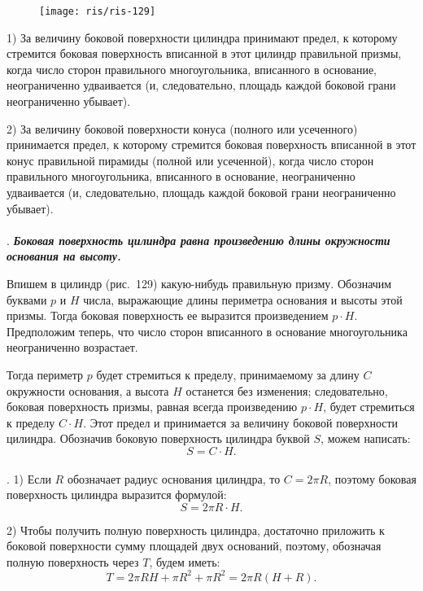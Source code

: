 \documentclass[twoside]{book}
\begin{document}
\begin{figure}[h!]
\centering
\texttt{[image: ris/ris-129]}
\caption{}
\end{figure}

1) За величину боковой поверхности цилиндра принимают предел, к которому стремится боковая поверхность вписанной в этот цилиндр правильной призмы, когда число сторон правильного многоугольника, вписанного в основание, неограниченно удваивается (и, следовательно, площадь каждой боковой грани неограниченно убывает).

2) За величину боковой поверхности конуса (полного или усеченного) принимается предел, к которому стремится боковая поверхность вписанной в этот конус правильной пирамиды (полной или усеченной), когда число сторон правильного многоугольника, вписанного в основание, неограниченно удваивается (и, следовательно, площадь каждой боковой грани неограниченно убывает). %

\paragraph{}\label{1938/s112}
.
\textbf{\emph{Боковая поверхность цилиндра равна произведению длины окружности основания на высоту.}}

Впишем в цилиндр (рис.~129) какую-нибудь правильную призму.
Обозначим буквами $p$ и $H$ числа, выражающие длины периметра основания и высоты этой призмы.
Тогда боковая поверхность ее выразится произведением $p\cdot H$.
Предположим теперь, что число сторон вписанного в основание многоугольника неограниченно возрастает.

Тогда периметр $p$ будет стремиться к пределу, принимаемому за длину $C$ окружности основания, а высота $H$ останется без изменения;
следовательно, боковая поверхность призмы, равная всегда произведению $p\cdot H$, будет стремиться к пределу $C\cdot H$.
Этот предел и принимается за величину боковой поверхности цилиндра.
Обозначив боковую поверхность цилиндра буквой $S$, можем написать:
\[S = C\cdot H.\]

\paragraph{}\label{1938/s113}
. 1) Если $R$ обозначает радиус основания цилиндра, то $C= 2\pi R$, поэтому боковая поверхность цилиндра выразится формулой:
\[S = 2\pi R \cdot H.\]

2) Чтобы получить полную поверхность цилиндра, достаточно приложить к боковой поверхности сумму площадей двух оснований, поэтому, обозначая полную поверхность через $T$, будем иметь:
\[T= 2\pi RH + \pi R^2 + \pi R^2 = 2\pi R(H + R).\]
\end{document}
